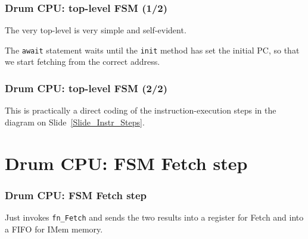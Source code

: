 
\begin{frame}[fragile]
\frametitle{Drum CPU: top-level FSM (1/2)}

\footnotesize

\begin{minipage}{0.725\textwidth}
\end{minipage}

\vspace{5ex}

The very top-level is very simple and self-evident.

\vspace{2ex}

The {\tt await} statement waits until the {\tt init} method has set
the initial PC, so that we start fetching from the correct address.

\end{frame}


\begin{frame}[fragile]
\frametitle{Drum CPU: top-level FSM (2/2)}

\footnotesize

\begin{minipage}{0.5\textwidth}
\end{minipage}
\hm
\begin{minipage}{0.45\textwidth}
 This is practically a direct coding of the instruction-execution steps
 in the diagram on Slide~\ref{Slide_Instr_Steps}.
\end{minipage}


\end{frame}


\section{Drum CPU: FSM Fetch step}

\begin{frame}[fragile]
\frametitle{Drum CPU: FSM Fetch step}

\footnotesize

\begin{minipage}{0.75\textwidth}
\end{minipage}
\hm
\begin{minipage}{0.2\textwidth}
 Just invokes {\tt fn\_Fetch} and sends the two results into a register for Fetch and
 into a FIFO for IMem memory.
\end{minipage}

\end{frame}

